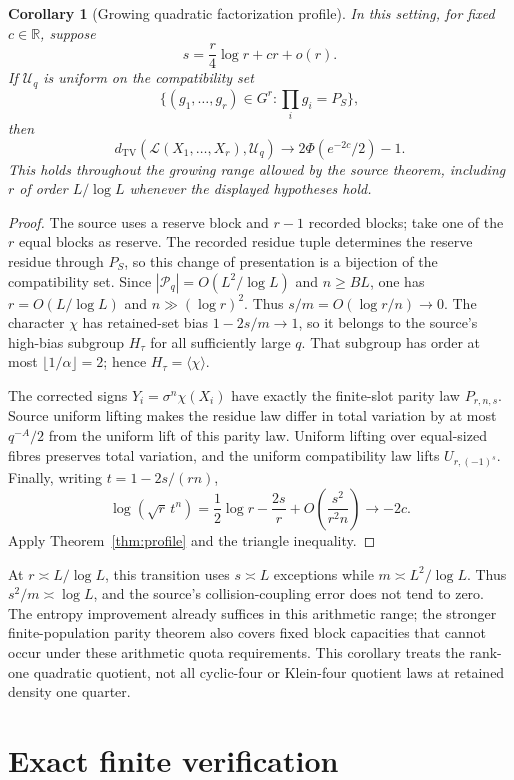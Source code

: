 \documentclass[11pt]{article}
\newtheorem{corollary}[theorem]{Corollary}
\newcommand{\TV}{d_{\mathrm{TV}}}
\newcommand{\Law}{\mathcal L}
\newcommand{\PhiN}{\Phi}
\begin{document}
\begin{corollary}[Growing quadratic factorization profile]\label{cor:arithmetic}
In this setting, for fixed $c\in\mathbb R$, suppose
\[
 s=\frac r4\log r+cr+o(r).
\]
If $\mathcal U_q$ is uniform on the compatibility set
\[
 \{(g_1,\ldots,g_r)\in G^r:\textstyle\prod_i g_i=P_S\},
\]
then
\[
 \TV(\Law(X_1,\ldots,X_r),\mathcal U_q)
 \longrightarrow 2\PhiN(e^{-2c}/2)-1.
\]
This holds throughout the growing range allowed by the source theorem,
including $r$ of order $L/\log L$ whenever the displayed hypotheses hold.
\end{corollary}

\begin{proof}
The source uses a reserve block and $r-1$ recorded blocks; take one of the
$r$ equal blocks as reserve. The recorded residue tuple determines the
reserve residue through $P_S$, so this change of presentation is a
bijection of the compatibility set. Since $|\mathcal P_q|=O(L^2/\log L)$
and $n\ge BL$, one has $r=O(L/\log L)$ and $n\gg(\log r)^2$.
Thus $s/m=O(\log r/n)\to0$. The character $\chi$ has retained-set bias
$1-2s/m\to1$, so it belongs to the source's high-bias subgroup $H_\tau$
for all sufficiently large $q$. That subgroup has order at most
$\lfloor1/\alpha\rfloor=2$; hence $H_\tau=\langle\chi\rangle$.

The corrected signs $Y_i=\sigma^n\chi(X_i)$ have exactly the finite-slot
parity law $P_{r,n,s}$. Source uniform lifting makes the residue law
differ in total variation by at most $q^{-A}/2$ from the uniform lift of
this parity law. Uniform lifting over equal-sized fibres preserves total
variation, and the uniform compatibility law lifts $U_{r,(-1)^s}$.
Finally, writing $t=1-2s/(rn)$,
\[
 \log(\sqrt r\,t^n)
 =\frac12\log r-\frac{2s}{r}
 +O\left(\frac{s^2}{r^2n}\right)\longrightarrow-2c.
\]
Apply Theorem~\ref{thm:profile} and the triangle inequality.
\end{proof}

At $r\asymp L/\log L$, this transition uses $s\asymp L$ exceptions
while $m\asymp L^2/\log L$. Thus $s^2/m\asymp\log L$, and the source's
collision-coupling error does not tend to zero. The entropy improvement
already suffices in this arithmetic range; the stronger finite-population
parity theorem also covers fixed block capacities that cannot occur
under these arithmetic quota requirements. This corollary treats the
rank-one quadratic quotient, not all cyclic-four or Klein-four quotient
laws at retained density one quarter.

\section{Exact finite verification}
\end{document}

